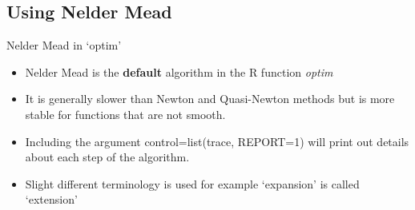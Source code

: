\documentclass[10pt]{beamer}
\begin{document}
                                                                                              \subsection{Using Nelder Mead}
                                                                                              \begin{frame}{Nelder Mead in `optim'}
                                                                                                \begin{itemize}
                                                                                                \item Nelder Mead is the {\bf default} algorithm in the R function {\em optim}
                                                                                                \item It is generally slower than Newton and Quasi-Newton methods but is more stable for functions that are not smooth.
                                                                                                \item Including the argument
                                                                                                  control=list(trace, REPORT=1) will print out details about each step of the algorithm.
                                                                                                \item Slight different terminology is used for example `expansion' is called `extension'
                                                                                                \end{itemize}
                                                                                              \end{frame}
\end{document}
